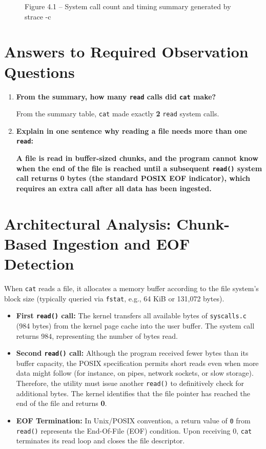\documentclass[12pt,a4paper]{report}
\numberwithin{equation}{chapter}
\numberwithin{figure}{chapter}
\numberwithin{table}{chapter}
\begin{document}
\begin{figure}[H]
\centering
\caption{Figure 4.1 -- System call count and timing summary generated by strace -c}
\end{figure}

\section{Answers to Required Observation Questions}
\begin{enumerate}
    \item \textbf{From the summary, how many \texttt{read} calls did \texttt{cat} make?}
    
    From the summary table, \texttt{cat} made exactly \textbf{2} \texttt{read} system calls.

    \item \textbf{Explain in one sentence why reading a file needs more than one \texttt{read}:}
    
    \textbf{A file is read in buffer-sized chunks, and the program cannot know when the end of the file is reached until a subsequent \texttt{read()} system call returns 0 bytes (the standard POSIX EOF indicator), which requires an extra call after all data has been ingested.}
\end{enumerate}

\section{Architectural Analysis: Chunk-Based Ingestion and EOF Detection}
When \texttt{cat} reads a file, it allocates a memory buffer according to the file system's block size (typically queried via \texttt{fstat}, e.g., 64 KiB or 131,072 bytes). 
\begin{itemize}
    \item \textbf{First \texttt{read()} call:} The kernel transfers all available bytes of \texttt{syscalls.c} (984 bytes) from the kernel page cache into the user buffer. The system call returns $984$, representing the number of bytes read.
    \item \textbf{Second \texttt{read()} call:} Although the program received fewer bytes than its buffer capacity, the POSIX specification permits short reads even when more data might follow (for instance, on pipes, network sockets, or slow storage). Therefore, the utility must issue another \texttt{read()} to definitively check for additional bytes. The kernel identifies that the file pointer has reached the end of the file and returns \textbf{0}.
    \item \textbf{EOF Termination:} In Unix/POSIX convention, a return value of \texttt{0} from \texttt{read()} represents the End-Of-File (EOF) condition. Upon receiving 0, \texttt{cat} terminates its read loop and closes the file descriptor.
\end{itemize}
\end{document}
